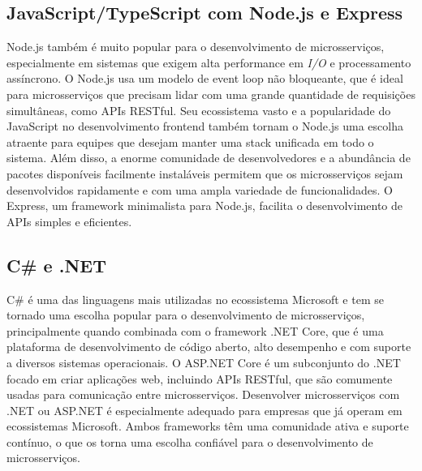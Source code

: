 \subsection{JavaScript/TypeScript com Node.js e Express}

Node.js também é muito popular para o desenvolvimento de microsserviços, especialmente em sistemas que exigem alta performance em \emph{I/O} e processamento assíncrono. O Node.js usa um modelo de event loop não bloqueante, que é ideal para microsserviços que precisam lidar com uma grande quantidade de requisições simultâneas, como APIs RESTful. Seu ecossistema vasto e a popularidade do JavaScript no desenvolvimento frontend também tornam o Node.js uma escolha atraente para equipes que desejam manter uma stack unificada em todo o sistema. Além disso, a enorme comunidade de desenvolvedores e a abundância de pacotes disponíveis facilmente instaláveis permitem que os microsserviços sejam desenvolvidos rapidamente e com uma ampla variedade de funcionalidades. O Express, um framework minimalista para Node.js, facilita o desenvolvimento de APIs simples e eficientes. 
\cite{expressjs,nodejs}

\subsection{C\# e .NET}

C\# é uma das linguagens mais utilizadas no ecossistema Microsoft e tem se tornado uma escolha popular para o desenvolvimento de microsserviços, principalmente quando combinada com o framework .NET Core, que é uma plataforma de desenvolvimento de código aberto, alto desempenho e com suporte a diversos sistemas operacionais. O ASP.NET Core é um subconjunto do .NET focado em criar aplicações web, incluindo APIs RESTful, que são comumente usadas para comunicação entre microsserviços. Desenvolver microsserviços com .NET ou ASP.NET é especialmente adequado para empresas que já operam em ecossistemas Microsoft. Ambos frameworks têm uma comunidade ativa e suporte contínuo, o que os torna uma escolha confiável para o desenvolvimento de microsserviços. 
\cite{dotnetcore,aspnetcore}



